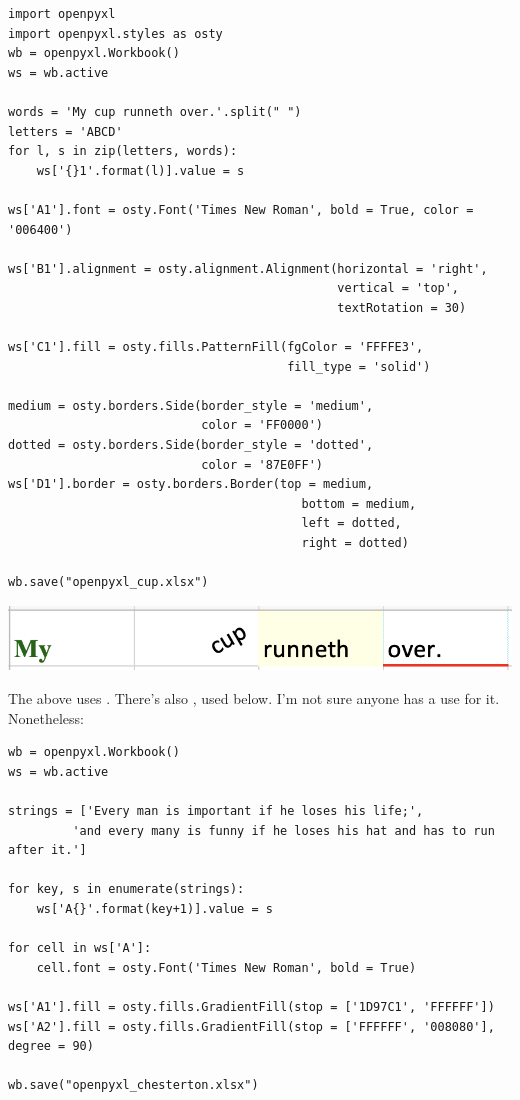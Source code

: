 \begin{lstlisting}
import openpyxl
import openpyxl.styles as osty
wb = openpyxl.Workbook()
ws = wb.active

words = 'My cup runneth over.'.split(" ")
letters = 'ABCD'
for l, s in zip(letters, words):
    ws['{}1'.format(l)].value = s
    
ws['A1'].font = osty.Font('Times New Roman', bold = True, color = '006400')

ws['B1'].alignment = osty.alignment.Alignment(horizontal = 'right', 
                                              vertical = 'top', 
                                              textRotation = 30)

ws['C1'].fill = osty.fills.PatternFill(fgColor = 'FFFFE3', 
                                       fill_type = 'solid')

medium = osty.borders.Side(border_style = 'medium',
                           color = 'FF0000')
dotted = osty.borders.Side(border_style = 'dotted',
                           color = '87E0FF')
ws['D1'].border = osty.borders.Border(top = medium, 
                                         bottom = medium,
                                         left = dotted,
                                         right = dotted)

wb.save("openpyxl_cup.xlsx")
\end{lstlisting}


\begin{center}
    \includegraphics[width = .58\textwidth]{images/cup_runneth.png}
\end{center}

The above uses . There's also , used below. I'm not sure anyone has a use for it. Nonetheless: 

\begin{lstlisting}
wb = openpyxl.Workbook()
ws = wb.active

strings = ['Every man is important if he loses his life;',
         'and every many is funny if he loses his hat and has to run after it.']

for key, s in enumerate(strings):
    ws['A{}'.format(key+1)].value = s

for cell in ws['A']:
    cell.font = osty.Font('Times New Roman', bold = True)

ws['A1'].fill = osty.fills.GradientFill(stop = ['1D97C1', 'FFFFFF'])
ws['A2'].fill = osty.fills.GradientFill(stop = ['FFFFFF', '008080'], degree = 90)

wb.save("openpyxl_chesterton.xlsx")
\end{lstlisting}

